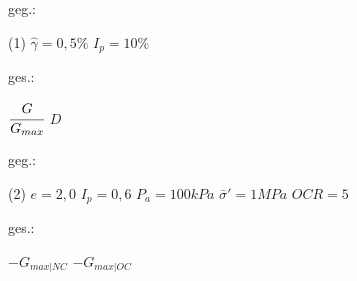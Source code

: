 \documentclass[12pt]{exam}
\begin{document}
\begin{questions}
  \vspace{1em}
 
     \begin{minipage}[t]{.49\linewidth}
    geg.:
    \begin{tasks}(1)
      \task[] $\hat\gamma = 0,5\%$
      \task[] $I_p = 10 \%$
    \end{tasks}
    \end{minipage}
    \begin{minipage}[t]{.49\linewidth}
    ges.:
        \begin{tasks}
            \task $\cfrac{G}{G_{max}}$
            \task $D$
        \end{tasks}
    \end{minipage}
    
    \begin{center}\end{center}

\vspace{1cm}

  \vspace{1em}
 
     \begin{minipage}[t]{.49\linewidth}
    geg.:
    \begin{tasks}(2)
      \task[] $e = 2,0$
    \task[] $I_p = 0,6$
    \task[] $P_a = 100 kPa$
    \task[] $\bar \sigma' = 1 MPa$
    \task[] $OCR = 5$
    \end{tasks}
    \end{minipage}
    \begin{minipage}[t]{.49\linewidth}
    ges.:
        \begin{tasks}
            \task $- G_{max|NC}$
            \task $- G_{max|OC}$
        \end{tasks}
    \end{minipage}
 \begin{center}\end{center}


\end{questions}
\end{document}
